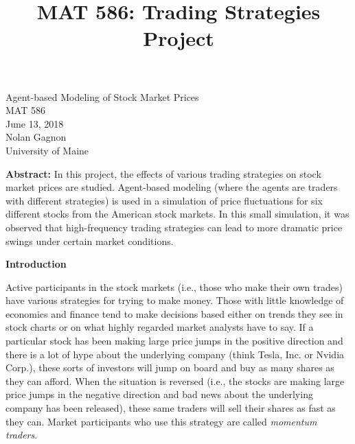 \documentclass[12pt]{article}
\title{MAT 586: Trading Strategies Project}
\begin{document}
\vspace*{70mm}
\begin{Large}
\begin{center}
Agent-based Modeling of Stock Market Prices \\
MAT 586 \\
June 13, 2018 \\
Nolan Gagnon \\
University of Maine
\end{center}
\end{Large}

\vfill

\noindent\textbf{Abstract:} In this project, the effects of various trading strategies on stock market prices are studied.  Agent-based modeling (where the agents are traders with different strategies) is used in a simulation of price fluctuations for six different stocks from the American stock markets. In this small simulation, it was observed that high-frequency trading strategies can lead to more dramatic price swings under certain market conditions. 

\pagebreak
{}
\begin{center}
\begin{large}
\noindent\textbf{Introduction}
\end{large}
\end{center}

Active participants in the stock markets (i.e., those who make their own trades) have various strategies for trying to make money. Those with little knowledge of economics and finance tend to make decisions based either on trends they see in stock charts or on what highly regarded market analysts have to say. If a particular stock has been making large price jumps in the positive direction and there is a lot of hype about the underlying company (think Tesla, Inc. or Nvidia Corp.), these sorts of investors will jump on board and buy as many shares as they can afford.  When the situation is reversed (i.e., the stocks are making large price jumps in the negative direction and bad news about the underlying company has been released), these same traders will sell their shares as fast as they can. Market participants who use this strategy are called \textit{momentum traders}.
\end{document}
